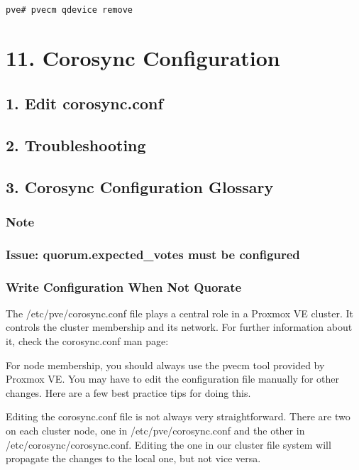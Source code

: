 \begin{lstlisting}

pve# pvecm qdevice remove

\end{lstlisting}


\section{11. Corosync Configuration}

\subsection{1. Edit corosync.conf}

\subsection{2. Troubleshooting}

\subsection{3. Corosync Configuration Glossary}

\subsubsection{Note}

\subsubsection{Issue: quorum.expected_votes must be configured}

\subsubsection{Write Configuration When Not Quorate}

The /etc/pve/corosync.conf file plays a central role in a Proxmox VE cluster. It controls the cluster membership and its network. For further information about it, check the corosync.conf man page:

For node membership, you should always use the pvecm tool provided by Proxmox VE. You may have to edit the configuration file manually for other changes. Here are a few best practice tips for doing this.

Editing the corosync.conf file is not always very straightforward. There are two on each cluster node, one in /etc/pve/corosync.conf and the other in /etc/corosync/corosync.conf. Editing the one in our cluster file system will propagate the changes to the local one, but not vice versa.

